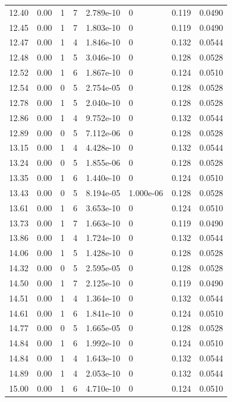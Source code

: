 \documentclass[preview]{standalone}
\begin{document}
{{{\begin{tabular}{L{1.2cm}C{1.2cm} C{0.3cm}C{0.5cm} C{1.4cm}C{1.4cm} C{1.4cm}C{1.4cm}}
  12.40  &  0.00  & 1     &  7 &  2.789e-10  & 0  & 0.119 &  0.0490   \\ 
  12.45  &  0.00  & 1     &  7 &  1.803e-10  & 0  & 0.119 &  0.0490   \\ 
  12.47  &  0.00  & 1     &  4 &  1.846e-10  & 0  & 0.132 &  0.0544   \\ 
  12.48  &  0.00  & 1     &  5 &  3.046e-10  & 0  & 0.128 &  0.0528   \\ 
  12.52  &  0.00  & 1     &  6 &  1.867e-10  & 0  & 0.124 &  0.0510   \\ 
  12.54  &  0.00  & 0     &  5 &  2.754e-05  & 0  & 0.128 &  0.0528   \\ 
  12.78  &  0.00  & 1     &  5 &  2.040e-10  & 0  & 0.128 &  0.0528   \\ 
  12.86  &  0.00  & 1     &  4 &  9.752e-10  & 0  & 0.132 &  0.0544   \\ 
  12.89  &  0.00  & 0     &  5 &  7.112e-06  & 0  & 0.128 &  0.0528   \\ 
  13.15  &  0.00  & 1     &  4 &  4.428e-10  & 0  & 0.132 &  0.0544   \\ 
  13.24  &  0.00  & 0     &  5 &  1.855e-06  & 0  & 0.128 &  0.0528   \\ 
  13.35  &  0.00  & 1     &  6 &  1.440e-10  & 0  & 0.124 &  0.0510   \\ 
  13.43  &  0.00  & 0     &  5 &  8.194e-05  & 1.000e-06  & 0.128 &  0.0528   \\ 
  13.61  &  0.00  & 1     &  6 &  3.653e-10  & 0  & 0.124 &  0.0510   \\ 
  13.73  &  0.00  & 1     &  7 &  1.663e-10  & 0  & 0.119 &  0.0490   \\ 
  13.86  &  0.00  & 1     &  4 &  1.724e-10  & 0  & 0.132 &  0.0544   \\ 
  14.06  &  0.00  & 1     &  5 &  1.428e-10  & 0  & 0.128 &  0.0528   \\ 
  14.32  &  0.00  & 0     &  5 &  2.595e-05  & 0  & 0.128 &  0.0528   \\ 
  14.50  &  0.00  & 1     &  7 &  2.125e-10  & 0  & 0.119 &  0.0490   \\ 
  14.51  &  0.00  & 1     &  4 &  1.364e-10  & 0  & 0.132 &  0.0544   \\ 
  14.61  &  0.00  & 1     &  6 &  1.841e-10  & 0  & 0.124 &  0.0510   \\ 
  14.77  &  0.00  & 0     &  5 &  1.665e-05  & 0  & 0.128 &  0.0528   \\ 
  14.84  &  0.00  & 1     &  6 &  1.992e-10  & 0  & 0.124 &  0.0510   \\ 
  14.84  &  0.00  & 1     &  4 &  1.643e-10  & 0  & 0.132 &  0.0544   \\ 
  14.89  &  0.00  & 1     &  4 &  2.053e-10  & 0  & 0.132 &  0.0544   \\ 
  15.00  &  0.00  & 1     &  6 &  4.710e-10  & 0  & 0.124 &  0.0510   \\ 
\hline 
\end{tabular} 

}}}
\end{document}
